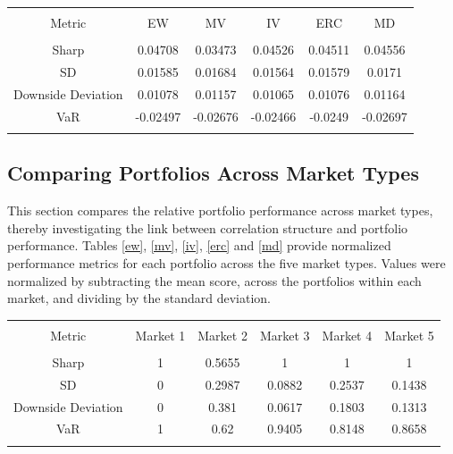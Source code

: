 \documentclass[11pt,preprint, authoryear]{elsarticle}
\let\origtable\table
\let\endorigtable\endtable
\renewenvironment{table}[1][2] {
    \expandafter\origtable\expandafter[H]
} {
    \endorigtable
}
\numberwithin{equation}{section}
\numberwithin{figure}{section}
\numberwithin{table}{section}
\begin{document}
\begin{table}[!htbp] \centering 
  \caption{Market 5 Risk Metrics} 
  \label{rm5} 
\begin{tabular}{@{\extracolsep{5pt}} cccccc} 
\\[-1.8ex]\hline 
\hline \\[-1.8ex] 
Metric & EW & MV & IV & ERC & MD \\ 
\hline \\[-1.8ex] 
Sharp & 0.04708 & 0.03473 & 0.04526 & 0.04511 & 0.04556 \\ 
SD & 0.01585 & 0.01684 & 0.01564 & 0.01579 & 0.0171 \\ 
Downside Deviation & 0.01078 & 0.01157 & 0.01065 & 0.01076 & 0.01164 \\ 
VaR & -0.02497 & -0.02676 & -0.02466 & -0.0249 & -0.02697 \\ 
\hline \\[-1.8ex] 
\end{tabular} 
\end{table}

\hypertarget{comparing-portfolios-across-market-types}{%
\subsection{\texorpdfstring{Comparing Portfolios Across Market Types
\label {cross-market}}{Comparing Portfolios Across Market Types }}\label{comparing-portfolios-across-market-types}}

This section compares the relative portfolio performance across market
types, thereby investigating the link between correlation structure and
portfolio performance. Tables \ref{ew}, \ref{mv}, \ref{iv}, \ref{erc}
and \ref{md} provide normalized performance metrics for each portfolio
across the five market types. Values were normalized by subtracting the
mean score, across the portfolios within each market, and dividing by
the standard deviation.

\begin{table}[!htbp] \centering 
  \caption{Equal Weight} 
  \label{ew} 
\begin{tabular}{@{\extracolsep{5pt}} cccccc} 
\\[-1.8ex]\hline 
\hline \\[-1.8ex] 
Metric & Market 1 & Market 2 & Market 3 & Market 4 & Market 5 \\ 
\hline \\[-1.8ex] 
Sharp & 1 & 0.5655 & 1 & 1 & 1 \\ 
SD & 0 & 0.2987 & 0.0882 & 0.2537 & 0.1438 \\ 
Downside Deviation & 0 & 0.381 & 0.0617 & 0.1803 & 0.1313 \\ 
VaR & 1 & 0.62 & 0.9405 & 0.8148 & 0.8658 \\ 
\hline \\[-1.8ex] 
\end{tabular} 
\end{table}
\end{document}
